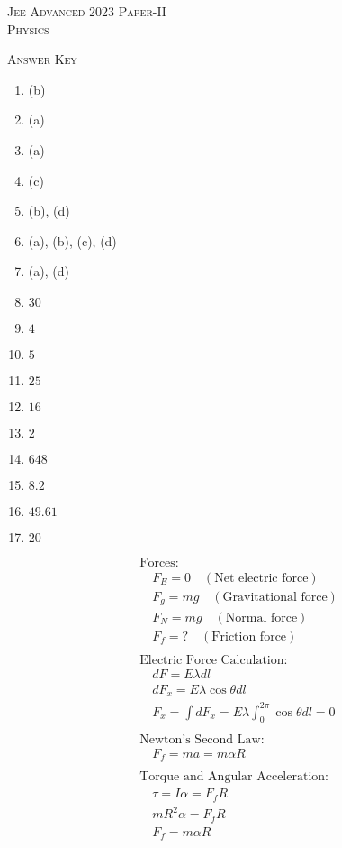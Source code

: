 \begin{center}
    \textsc{Jee Advanced 2023 Paper-II\\Physics}
\end{center}

\begin{center}
    \textsc{Answer Key}
\end{center}

\begin{multicols}{4}
\begin{enumerate}
    \item (b)
    \item (a)
    \item (a)
    \item (c)
    \item (b), (d)
    \item (a), (b), (c), (d)
    \item (a), (d)
    \item $30$
    \item $4$
    \item $5$
    \item $25$
    \item $16$
    \item $2$
    \item $648$
    \item $8.2$
    \item $49.61$
    \item $20$
\end{enumerate}
\end{multicols}

\begin{align*}
    &\text{Forces:} \\
    &\quad F_E = 0 \quad (\text{Net electric force}) \\
    &\quad F_g = mg \quad (\text{Gravitational force}) \\
    &\quad F_N = mg \quad (\text{Normal force}) \\
    &\quad F_f = ? \quad (\text{Friction force}) \\
    \\
    &\text{Electric Force Calculation:} \\
    &\quad dF = E \lambda dl \\
    &\quad dF_x = E \lambda \cos\theta dl \\
    &\quad F_x = \int dF_x = E \lambda \int_0^{2\pi} \cos\theta dl = 0 \\
    \\
    &\text{Newton's Second Law:} \\
    &\quad F_f = ma = m \alpha R \\
    \\
    &\text{Torque and Angular Acceleration:} \\
    &\quad \tau = I \alpha = F_f R \\
    &\quad mR^2 \alpha = F_f R \\
    &\quad F_f = m \alpha R 
    \end{align*}


